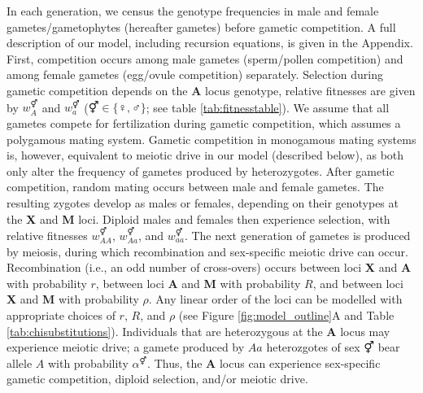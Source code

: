 \documentclass[12pt]{article}
\begin{document}
In each generation, we census the genotype frequencies in male and female gametes/gametophytes (hereafter gametes) before gametic competition. 
A full description of our model, including recursion equations, is given in the Appendix. 
First, competition occurs among male gametes (sperm/pollen competition) and among female gametes (egg/ovule competition) separately. 
Selection during gametic competition depends on the \textbf{A} locus genotype, relative fitnesses are given by $w_A^\Hermaphrodite$ and $w_a^\Hermaphrodite$ ($\Hermaphrodite \in \{\female,\male\}$; see table \ref{tab:fitnesstable}). %
We assume that all gametes compete for fertilization during gametic competition, which assumes a polygamous mating system. 
Gametic competition in monogamous mating systems is, however, equivalent to meiotic drive in our model (described below), as both only alter the frequency of gametes produced by heterozygotes. 
After gametic competition, random mating occurs between male and female gametes.
The resulting zygotes develop as males or females, depending on their genotypes at the \textbf{X} and \textbf{M} loci. %
Diploid males and females then experience selection, with relative fitnesses $w_{AA}^{\Hermaphrodite}$, $w_{Aa}^{\Hermaphrodite}$, and $w_{aa}^{\Hermaphrodite}$. %
The next generation of gametes is produced by meiosis, during which recombination and sex-specific meiotic drive can occur. 
Recombination (i.e., an odd number of cross-overs) occurs between loci \textbf{X} and \textbf{A} with probability $r$, between loci \textbf{A} and \textbf{M} with probability $R$, and between loci \textbf{X} and \textbf{M} with probability $\rho$.
Any linear order of the loci can be modelled with appropriate choices of $r$, $R$, and $\rho$ (see Figure \ref{fig:model_outline}A and Table \ref{tab:chisubstitutions}). 
Individuals that are heterozygous at the \textbf{A} locus may experience meiotic drive; a gamete produced by $Aa$ heterozgotes of sex $\Hermaphrodite$ bear allele $A$ with probability $\alpha^\Hermaphrodite$. 
Thus, the \textbf{A} locus can experience sex-specific gametic competition, diploid selection, and/or meiotic drive. 
\end{document}

